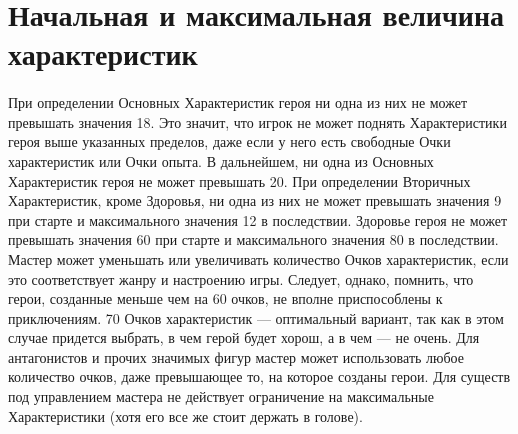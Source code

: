 \section{Начальная и максимальная величина характеристик}
\paragraph{}
{\color{orange}При определении Основных Характеристик героя ни одна из них не может превышать значения 18. Это значит, что игрок не может поднять Характеристики героя выше указанных пределов, даже если у него есть свободные Очки характеристик или Очки опыта. В дальнейшем, ни одна из Основных Характеристик героя не может превышать 20. 
\newline При определении Вторичных Характеристик, кроме Здоровья, ни одна из них не может превышать значения 9 при старте и максимального значения 12 в последствии.
\newline Здоровье героя не может превышать значения 60 при старте и максимального значения 80 в последствии.}
\newline Мастер может уменьшать или увеличивать количество Очков характеристик, если это соответствует жанру и настроению игры. Следует, однако, помнить, что герои, созданные меньше чем на 60 очков, не вполне приспособлены к приключениям. 70 Очков характеристик — оптимальный вариант, так как в этом случае придется выбрать, в чем герой будет хорош, а в чем — не очень.
\newline Для антагонистов и прочих значимых фигур мастер может использовать любое количество очков, даже превышающее то, на которое созданы герои. Для существ под управлением мастера не действует ограничение на максимальные Характеристики (хотя его все же стоит держать в голове).

